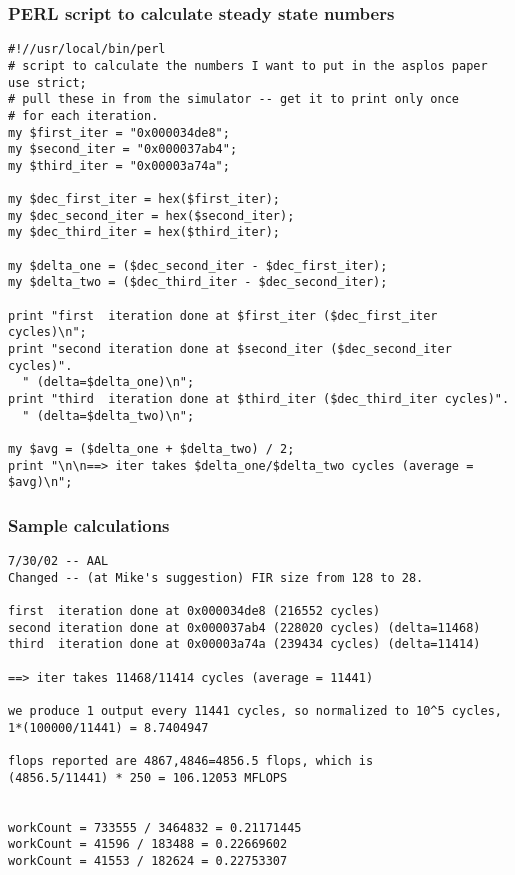 \subsubsection{PERL script to calculate steady state numbers}
\begin{verbatim}
#!//usr/local/bin/perl
# script to calculate the numbers I want to put in the asplos paper
use strict;
# pull these in from the simulator -- get it to print only once
# for each iteration.
my $first_iter = "0x000034de8";
my $second_iter = "0x000037ab4";
my $third_iter = "0x00003a74a";

my $dec_first_iter = hex($first_iter);
my $dec_second_iter = hex($second_iter);
my $dec_third_iter = hex($third_iter);

my $delta_one = ($dec_second_iter - $dec_first_iter);
my $delta_two = ($dec_third_iter - $dec_second_iter);

print "first  iteration done at $first_iter ($dec_first_iter cycles)\n";
print "second iteration done at $second_iter ($dec_second_iter cycles)".
  " (delta=$delta_one)\n";
print "third  iteration done at $third_iter ($dec_third_iter cycles)".
  " (delta=$delta_two)\n";

my $avg = ($delta_one + $delta_two) / 2;
print "\n\n==> iter takes $delta_one/$delta_two cycles (average = $avg)\n";
\end{verbatim}




\subsubsection{Sample calculations}
\begin{verbatim}
7/30/02 -- AAL 
Changed -- (at Mike's suggestion) FIR size from 128 to 28.

first  iteration done at 0x000034de8 (216552 cycles)
second iteration done at 0x000037ab4 (228020 cycles) (delta=11468)
third  iteration done at 0x00003a74a (239434 cycles) (delta=11414)

==> iter takes 11468/11414 cycles (average = 11441)

we produce 1 output every 11441 cycles, so normalized to 10^5 cycles,
1*(100000/11441) = 8.7404947

flops reported are 4867,4846=4856.5 flops, which is
(4856.5/11441) * 250 = 106.12053 MFLOPS


workCount = 733555 / 3464832 = 0.21171445
workCount = 41596 / 183488 = 0.22669602
workCount = 41553 / 182624 = 0.22753307
\end{verbatim}

